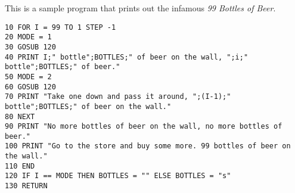This is a sample program that prints out the infamous \emph{99 Bottles of Beer}.

\begin{lstlisting}
10 FOR I = 99 TO 1 STEP -1
20 MODE = 1
30 GOSUB 120
40 PRINT I;" bottle";BOTTLES;" of beer on the wall, ";i;" bottle";BOTTLES;" of beer."
50 MODE = 2
60 GOSUB 120
70 PRINT "Take one down and pass it around, ";(I-1);" bottle";BOTTLES;" of beer on the wall."
80 NEXT
90 PRINT "No more bottles of beer on the wall, no more bottles of beer."
100 PRINT "Go to the store and buy some more. 99 bottles of beer on the wall."
110 END
120 IF I == MODE THEN BOTTLES = "" ELSE BOTTLES = "s"
130 RETURN
\end{lstlisting}
